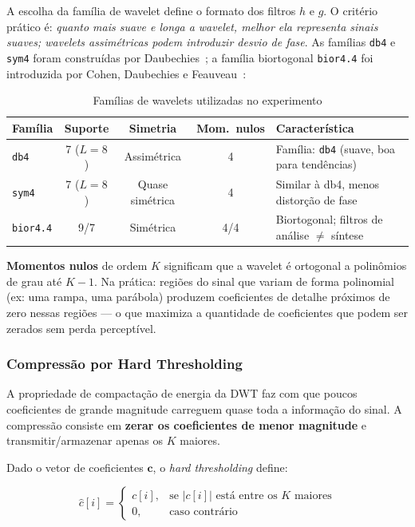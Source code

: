 \documentclass[12pt, a4paper]{article}
\begin{document}
A escolha da família de wavelet define o formato dos filtros $h$ e $g$. O critério prático é: \emph{quanto mais suave e longa a wavelet, melhor ela representa sinais suaves; wavelets assimétricas podem introduzir desvio de fase}. As famílias \texttt{db4} e \texttt{sym4} foram construídas por Daubechies~\cite{daubechies1992ten}; a família biortogonal \texttt{bior4.4} foi introduzida por Cohen, Daubechies e Feauveau~\cite{cohen1992biorthogonal}:

\begin{table}[H]
\centering
\caption{Famílias de wavelets utilizadas no experimento}
\begin{tabular}{lcccp{5cm}}
\toprule
\textbf{Família} & \textbf{Suporte} & \textbf{Simetria} & \textbf{Mom.\ nulos} & \textbf{Característica} \\
\midrule
\texttt{db4}     & 7 ($L=8$) & Assimétrica     & 4   & Família: \texttt{db4} (suave, boa para tendências) \\
\texttt{sym4}    & 7 ($L=8$) & Quase simétrica & 4   & Similar à db4, menos distorção de fase \\
\texttt{bior4.4} & 9/7       & Simétrica       & 4/4 & Biortogonal; filtros de análise $\neq$ síntese \\
\bottomrule
\end{tabular}
\end{table}

\textbf{Momentos nulos} de ordem $K$ significam que a wavelet é ortogonal a polinômios de grau até $K-1$. Na prática: regiões do sinal que variam de forma polinomial (ex: uma rampa, uma parábola) produzem coeficientes de detalhe próximos de zero nessas regiões — o que maximiza a quantidade de coeficientes que podem ser zerados sem perda perceptível.

\subsubsection{Compressão por Hard Thresholding}

A propriedade de compactação de energia da DWT faz com que poucos coeficientes de grande magnitude carreguem quase toda a informação do sinal. A compressão consiste em \textbf{zerar os coeficientes de menor magnitude} e transmitir/armazenar apenas os $K$ maiores.

Dado o vetor de coeficientes $\mathbf{c}$, o \textit{hard thresholding} define:

\begin{equation}
    \hat{c}[i] =
    \begin{cases}
        c[i], & \text{se } |c[i]| \text{ está entre os } K \text{ maiores} \\
        0,    & \text{caso contrário}
    \end{cases}
\end{equation}
\end{document}
